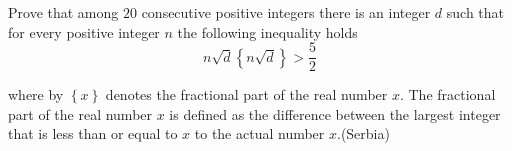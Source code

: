 Prove that among $20$ consecutive positive integers there is an integer $d$ such that for every positive integer $n$ the following inequality holds$$n \sqrt{d} \left\{n \sqrt {d} \right \} > \dfrac{5}{2}$$

where by $\left \{x \right \}$ denotes the fractional part of the real number $x$. The fractional part of the real number $x$ is defined as the difference between the largest integer that is less than or equal to $x$ to the actual number $x$.(Serbia)